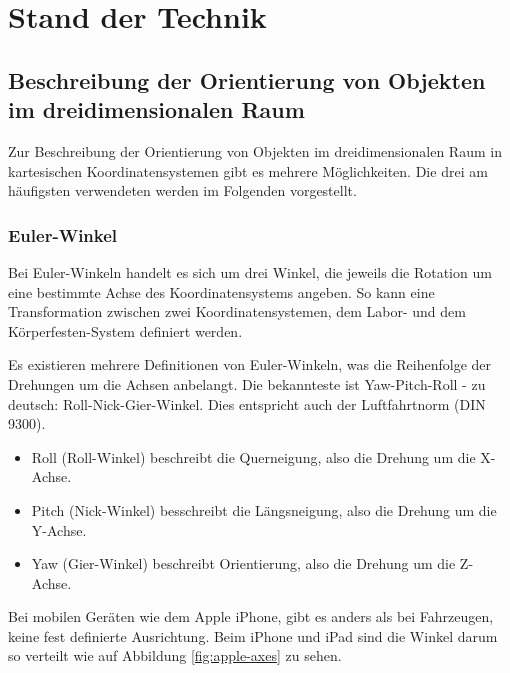 
\chapter{Stand der Technik}
  \label{Stand der Technik}

\section{Beschreibung der Orientierung von Objekten im dreidimensionalen Raum}
Zur Beschreibung der Orientierung von Objekten im dreidimensionalen Raum in kartesischen Koordinatensystemen gibt es mehrere Möglichkeiten. Die drei am häufigsten verwendeten werden im Folgenden vorgestellt.

\subsection{Euler-Winkel}
Bei Euler-Winkeln handelt es sich um drei Winkel, die jeweils die Rotation um eine bestimmte Achse des Koordinatensystems angeben. So kann eine Transformation zwischen zwei Koordinatensystemen, dem Labor- und dem Körperfesten-System definiert werden.

Es existieren mehrere Definitionen von Euler-Winkeln, was die Reihenfolge der Drehungen um die Achsen anbelangt. Die bekannteste ist Yaw-Pitch-Roll - zu deutsch: Roll-Nick-Gier-Winkel. Dies entspricht auch der Luftfahrtnorm (DIN 9300).

\begin{itemize}
	\item Roll (Roll-Winkel) beschreibt die Querneigung, also die Drehung um die X-Achse.
	\item Pitch (Nick-Winkel) besschreibt die Längsneigung, also die Drehung um die Y-Achse.
	\item Yaw (Gier-Winkel) beschreibt Orientierung, also die Drehung um die Z-Achse.
\end{itemize}

Bei mobilen Geräten wie dem Apple iPhone, gibt es anders als bei Fahrzeugen, keine fest definierte Ausrichtung. Beim iPhone und iPad sind die Winkel darum so verteilt wie auf Abbildung \ref{fig:apple-axes} zu sehen.

